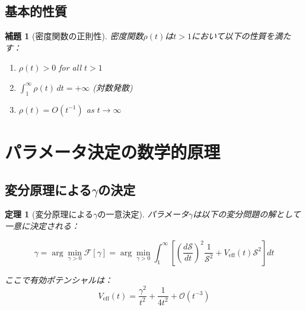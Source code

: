 \documentclass[12pt]{article}
\newtheorem{theorem}{定理}
\newtheorem{lemma}{補題}
\begin{document}
\subsection{基本的性質}

\begin{lemma}[密度関数の正則性]
密度関数$\rho(t)$は$t > 1$において以下の性質を満たす：
\begin{enumerate}
\item $\rho(t) > 0$ for all $t > 1$
\item $\int_1^{\infty} \rho(t) \, dt = +\infty$ (対数発散)
\item $\rho(t) = O(t^{-1})$ as $t \to \infty$
\end{enumerate}
\end{lemma}

\section{パラメータ決定の数学的原理}

\subsection{変分原理による$\gamma$の決定}

\begin{theorem}[変分原理による$\gamma$の一意決定]
パラメータ$\gamma$は以下の変分問題の解として一意に決定される：

\begin{equation}
\gamma = \arg\min_{\gamma > 0} \mathcal{F}[\gamma] = \arg\min_{\gamma > 0} \int_1^{\infty} \left[\left(\frac{d\mathcal{S}}{dt}\right)^2 \frac{1}{\mathcal{S}^2} + V_{\text{eff}}(t) \mathcal{S}^2\right] dt
\end{equation}

ここで有効ポテンシャルは：
\begin{equation}
V_{\text{eff}}(t) = \frac{\gamma^2}{t^2} + \frac{1}{4t^2} + \mathcal{O}(t^{-3})
\end{equation}
\end{theorem}
\end{document}
